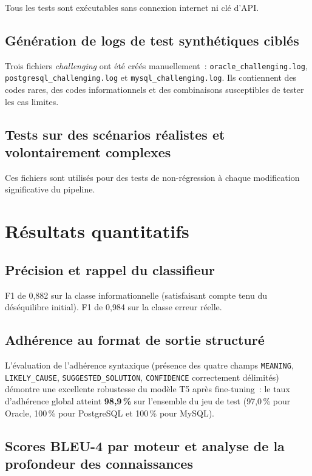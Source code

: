 \documentclass[12pt,a4paper]{report}
\begin{document}
Tous les tests sont ex\'ecutables sans connexion internet ni cl\'e d'API.

\subsection{G\'en\'eration de logs de test synth\'etiques cibl\'es}

Trois fichiers \emph{challenging} ont \'et\'e cr\'e\'es manuellement~:
\texttt{oracle\_challenging.log}, \texttt{postgresql\_challenging.log} et
\texttt{mysql\_challenging.log}. Ils contiennent des codes rares, des codes
informationnels et des combinaisons susceptibles de tester les cas limites.

\subsection{Tests sur des sc\'enarios r\'ealistes et volontairement complexes}

Ces fichiers sont utilis\'es pour des tests de non-r\'egression \`a chaque
modification significative du pipeline.

\section{R\'esultats quantitatifs}

\subsection{Pr\'ecision et rappel du classifieur}

F1 de 0,882 sur la classe informationnelle (satisfaisant compte tenu du
d\'es\'equilibre initial). F1 de 0,984 sur la classe erreur r\'eelle.

\subsection{Adh\'erence au format de sortie structur\'e}

L'\'evaluation de l'adh\'erence syntaxique (pr\'esence des quatre champs \texttt{MEANING},
\texttt{LIKELY\_CAUSE}, \texttt{SUGGESTED\_SOLUTION}, \texttt{CONFIDENCE} correctement
d\'elimit\'es) d\'emontre une excellente robustesse du mod\`ele T5 apr\`es fine-tuning~:
le taux d'adh\'erence global atteint \textbf{98,9\,\%} sur l'ensemble du jeu de test
(97,0\,\% pour Oracle, 100\,\% pour PostgreSQL et 100\,\% pour MySQL).

\subsection{Scores BLEU-4 par moteur et analyse de la profondeur des connaissances}
\end{document}
